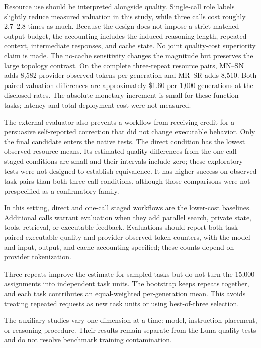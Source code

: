 Resource use should be interpreted alongside quality. Single-call role labels slightly reduce measured valuation in this study, while three calls cost roughly 2.7--2.8 times as much. Because the design does not impose a strict matched output budget, the accounting includes the induced reasoning length, repeated context, intermediate responses, and cache state. No joint quality-cost superiority claim is made. The no-cache sensitivity changes the magnitude but preserves the large topology contrast. On the complete three-repeat resource pairs, MN--SN adds 8,582 provider-observed tokens per generation and MR--SR adds 8,510. Both paired valuation differences are approximately \$1.60 per 1,000 generations at the disclosed rates. The absolute monetary increment is small for these function tasks; latency and total deployment cost were not measured.

The external evaluator also prevents a workflow from receiving credit for a persuasive self-reported correction that did not change executable behavior. Only the final candidate enters the native tests. The direct condition has the lowest observed resource means. Its estimated quality differences from the one-call staged conditions are small and their intervals include zero; these exploratory tests were not designed to establish equivalence. It has higher success on observed task pairs than both three-call conditions, although those comparisons were not prespecified as a confirmatory family.

In this setting, direct and one-call staged workflows are the lower-cost baselines. Additional calls warrant evaluation when they add parallel search, private state, tools, retrieval, or executable feedback. Evaluations should report both task-paired executable quality and provider-observed token counters, with the model and input, output, and cache accounting specified; these counts depend on provider tokenization.

Three repeats improve the estimate for sampled tasks but do not turn the 15,000 assignments into independent task units. The bootstrap keeps repeats together, and each task contributes an equal-weighted per-generation mean. This avoids treating repeated requests as new task units or using best-of-three selection.

The auxiliary studies vary one dimension at a time: model, instruction placement, or reasoning procedure. Their results remain separate from the Luna quality tests and do not resolve benchmark training contamination.

